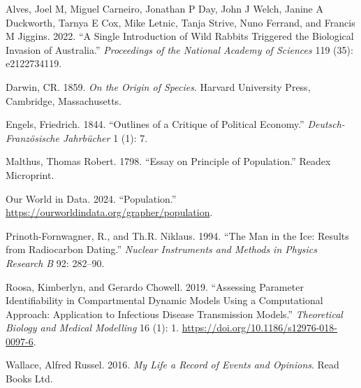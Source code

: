 \documentclass[
  letterpaper,
]{scrbook}
\newlength{\cslhangindent}
\newenvironment{CSLReferences}[2] %
 {\begin{list}{}{%
  \setlength{\itemindent}{0pt}
  \setlength{\leftmargin}{0pt}
  \setlength{\parsep}{0pt}
  \ifodd #1
   \setlength{\leftmargin}{\cslhangindent}
   \setlength{\itemindent}{-1\cslhangindent}
  \fi
  \setlength{\itemsep}{#2\baselineskip}}}
 {\end{list}}
\begin{document}
\label{refs}
\begin{CSLReferences}{1}{0}
Alves, Joel M, Miguel Carneiro, Jonathan P Day, John J Welch, Janine A
Duckworth, Tarnya E Cox, Mike Letnic, Tanja Strive, Nuno Ferrand, and
Francis M Jiggins. 2022. {``A Single Introduction of Wild Rabbits
Triggered the Biological Invasion of Australia.''} \emph{Proceedings of
the National Academy of Sciences} 119 (35): e2122734119.

Darwin, CR. 1859. \emph{On the Origin of Species}. Harvard University
Press, Cambridge, Massachusetts.

Engels, Friedrich. 1844. {``Outlines of a Critique of Political
Economy.''} \emph{Deutsch-Franz{ö}sische Jahrb{ü}cher} 1 (1): 7.

Malthus, Thomas Robert. 1798. {``Essay on Principle of Population.''}
Readex Microprint.

Our World in Data. 2024. {``Population.''}
\url{https://ourworldindata.org/grapher/population}.

Prinoth-Fornwagner, R., and Th.R. Niklaus. 1994. {``The Man in the Ice:
Results from Radiocarbon Dating.''} \emph{Nuclear Instruments and
Methods in Physics Research B} 92: 282--90.

Roosa, Kimberlyn, and Gerardo Chowell. 2019. {``Assessing Parameter
Identifiability in Compartmental Dynamic Models Using a Computational
Approach: Application to Infectious Disease Transmission Models.''}
\emph{Theoretical Biology and Medical Modelling} 16 (1): 1.
\url{https://doi.org/10.1186/s12976-018-0097-6}.

Wallace, Alfred Russel. 2016. \emph{My Life a Record of Events and
Opinions}. Read Books Ltd.

\end{CSLReferences}


\backmatter
\end{document}
